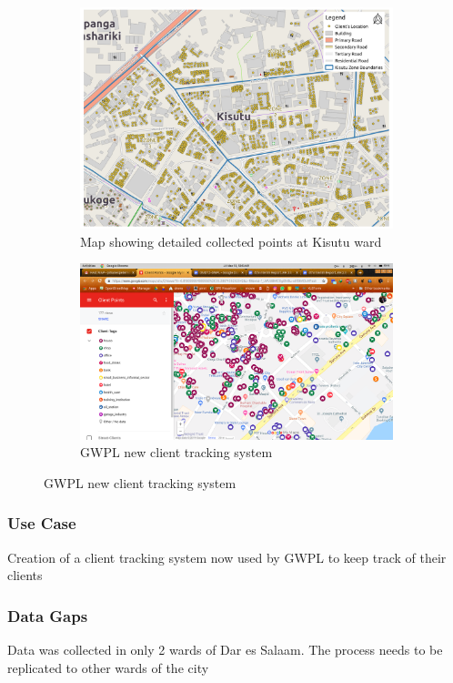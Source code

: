 \documentclass[a4paper,12pt,twoside]{article}
\begin{document}
\begin{figure}
  \begin{subfigure}[b]{0.4\textwidth}
    \includegraphics[width=\textwidth]{images/GWPL_client_map.png}
   \color{RHgreen}\caption{Map showing detailed collected points at Kisutu ward}
    \label{fig:1}
  \end{subfigure}
  \begin{subfigure}[b]{0.5\textwidth}
    \includegraphics[width=\textwidth]{images/GWPL_client_tracking_system.png}
    \color{RHgreen}\caption{GWPL new client tracking system}
    \label{fig:2}
  \end{subfigure}
\end{figure}
\subsubsection{Use Case}
Creation of a client tracking system now used by GWPL to keep track of their clients
\subsubsection{Data Gaps}
Data was collected in only 2 wards of Dar es Salaam. The process needs to be replicated to other wards of the city
\end{document}
